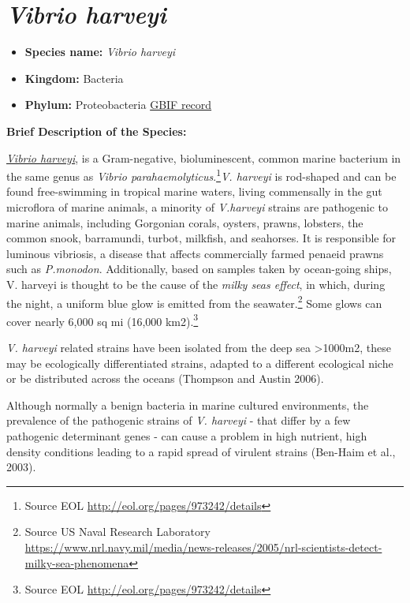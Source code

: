 \documentclass[]{book}
\providecommand{\tightlist}{%
  \setlength{\itemsep}{0pt}\setlength{\parskip}{0pt}}
\theoremstyle{definition}
\theoremstyle{definition}
\theoremstyle{definition}
\theoremstyle{remark}
\begin{document}
\hypertarget{vibrio-harveyi}{%
\section{\texorpdfstring{\emph{Vibrio
harveyi}}{Vibrio harveyi}}\label{vibrio-harveyi}}

\begin{itemize}
\tightlist
\item
  \textbf{Species name:} \emph{Vibrio harveyi}
\item
  \textbf{Kingdom:} Bacteria\\
\item
  \textbf{Phylum:} Proteobacteria
  \href{https://www.gbif.org/species/5427692}{GBIF record}
\end{itemize}

\textbf{Brief Description of the Species:}

\href{http://eol.org/pages/973242/details}{\emph{Vibrio harveyi}}, is a
Gram-negative, bioluminescent, common marine bacterium in the same genus
as \emph{Vibrio parahaemolyticus}.\footnote{Source EOL
  \url{http://eol.org/pages/973242/details}}\emph{V. harveyi} is
rod-shaped and can be found free-swimming in tropical marine waters,
living commensally in the gut microflora of marine animals, a minority
of \emph{V.harveyi} strains are pathogenic to marine animals, including
Gorgonian corals, oysters, prawns, lobsters, the common snook,
barramundi, turbot, milkfish, and seahorses. It is responsible for
luminous vibriosis, a disease that affects commercially farmed penaeid
prawns such as \emph{P.monodon}. Additionally, based on samples taken by
ocean-going ships, V. harveyi is thought to be the cause of the
\emph{milky seas effect}, in which, during the night, a uniform blue
glow is emitted from the seawater.\footnote{Source US Naval Research
  Laboratory
  \url{https://www.nrl.navy.mil/media/news-releases/2005/nrl-scientists-detect-milky-sea-phenomena}}
Some glows can cover nearly 6,000 sq mi (16,000 km2).\footnote{Source
  EOL \url{http://eol.org/pages/973242/details}}

\emph{V. harveyi} related strains have been isolated from the deep sea
\textgreater{}1000m2, these may be ecologically differentiated strains,
adapted to a different ecological niche or be distributed across the
oceans (Thompson and Austin 2006).

Although normally a benign bacteria in marine cultured environments, the
prevalence of the pathogenic strains of \emph{V. harveyi} - that differ
by a few pathogenic determinant genes - can cause a problem in high
nutrient, high density conditions leading to a rapid spread of virulent
strains (Ben-Haim et al., 2003).
\end{document}
